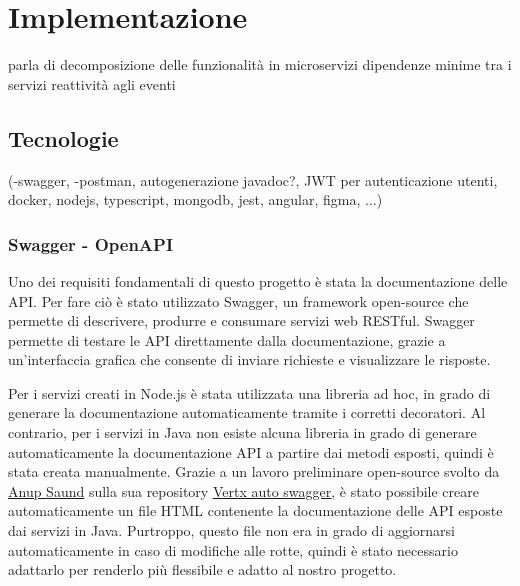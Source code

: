 \chapter{Implementazione}
\label{ch:implementazione} %
parla di decomposizione delle funzionalità in microservizi
dipendenze minime tra i servizi
reattività agli eventi
\section{Tecnologie}
(-swagger, -postman, autogenerazione javadoc?, JWT per autenticazione utenti,
 docker, nodejs, typescript, mongodb, jest, angular, figma, ...)
\subsection{Swagger - OpenAPI}

Uno dei requisiti fondamentali di questo progetto è stata la documentazione delle API.
Per fare ciò è stato utilizzato Swagger, un framework open-source che permette di descrivere, produrre e consumare servizi web RESTful. 
Swagger permette di testare le API direttamente dalla documentazione, grazie a un'interfaccia grafica che consente di inviare richieste e visualizzare le risposte.

\vspace{1cm}

Per i servizi creati in Node.js è stata utilizzata una libreria ad hoc, in grado di generare la documentazione automaticamente tramite i corretti decoratori.
Al contrario, per i servizi in Java non esiste alcuna libreria in grado di generare automaticamente la documentazione API a partire dai metodi esposti, quindi è stata creata manualmente.
Grazie a un lavoro preliminare open-source svolto da \href{https://github.com/anupsaund}{\underline{Anup Saund}} sulla sua repository \href{https://github.com/anupsaund/vertx-auto-swagger}{\underline{Vertx auto swagger}}, è stato possibile creare automaticamente un file HTML contenente la documentazione delle API esposte dai servizi in Java. 
Purtroppo, questo file non era in grado di aggiornarsi automaticamente in caso di modifiche alle rotte, quindi è stato necessario adattarlo per renderlo più flessibile e adatto al nostro progetto.

\vspace{1cm}

